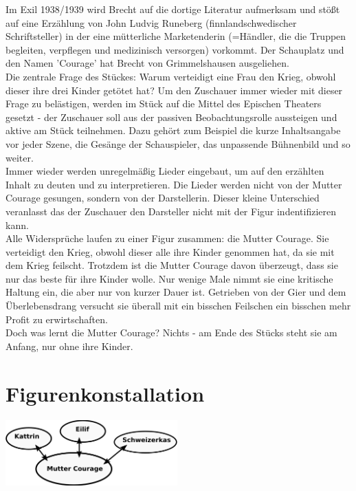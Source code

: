 \documentclass[a4paper]{article}
\begin{document}
        Im Exil 1938/1939 wird Brecht auf die dortige Literatur aufmerksam und stößt auf eine Erzählung von John Ludvig Runeberg (finnlandschwedischer Schriftsteller) in der eine mütterliche Marketenderin (=Händler, die die Truppen begleiten, verpflegen und medizinisch versorgen) vorkommt. Der Schauplatz und den Namen 'Courage' hat Brecht von Grimmelshausen ausgeliehen.\\
Die zentrale Frage des Stückes: Warum verteidigt eine Frau den Krieg, obwohl dieser ihre drei Kinder getötet hat? Um den Zuschauer immer wieder mit dieser Frage zu belästigen, werden im Stück auf die Mittel des Epischen Theaters gesetzt - der Zuschauer soll aus der passiven Beobachtungsrolle aussteigen und aktive am Stück teilnehmen. Dazu gehört zum Beispiel die kurze Inhaltsangabe vor jeder Szene, die Gesänge der Schauspieler, das unpassende Bühnenbild und so weiter.\\
Immer wieder werden unregelmäßig Lieder eingebaut, um auf den erzählten Inhalt zu deuten und zu interpretieren. Die Lieder werden nicht von der Mutter Courage gesungen, sondern von der Darstellerin. Dieser kleine Unterschied veranlasst das der Zuschauer den Darsteller nicht mit der Figur indentifizieren kann.\\
Alle Widersprüche laufen zu einer Figur zusammen: die Mutter Courage. Sie verteidigt den Krieg, obwohl dieser alle ihre Kinder genommen hat, da sie mit dem Krieg feilscht. Trotzdem ist die Mutter Courage davon überzeugt, dass sie nur das beste für ihre Kinder wolle. Nur wenige Male nimmt sie eine kritische Haltung ein, die aber nur von kurzer Dauer ist. Getrieben von der Gier und dem Überlebensdrang versucht sie überall mit ein bisschen Feilschen ein bisschen mehr Profit zu erwirtschaften.\\
Doch was lernt die Mutter Courage? Nichts - am Ende des Stücks steht sie am Anfang, nur ohne ihre Kinder.  

\section{Figurenkonstallation}
	\includegraphics[width=250px]{img/figuren.png}
        
\end{document}
